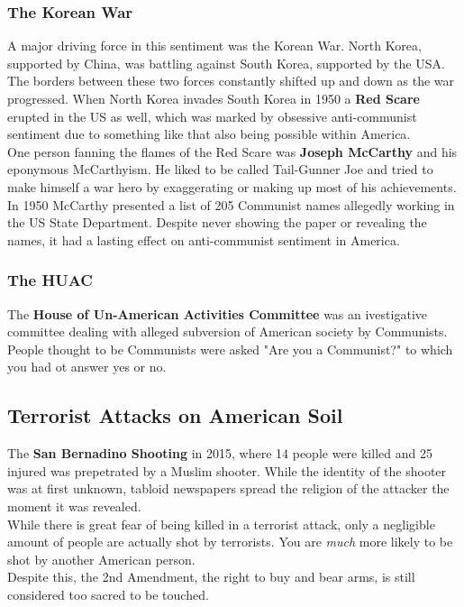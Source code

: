 \documentclass{article}
\begin{document}
	\subsubsection{The Korean War}
	A major driving force in this sentiment was the Korean War. North Korea, supported by China, was battling against South Korea, supported by the USA. The borders between these two forces constantly shifted up and down as the war progressed. When North Korea invades South Korea in 1950 a \textbf{Red Scare} erupted in the US as well, which was marked by obsessive anti-communist sentiment due to something like that also being possible within America. \\
	One person fanning the flames of the Red Scare was \textbf{Joseph McCarthy} and his eponymous McCarthyism. He liked to be called Tail-Gunner Joe and tried to make himself a war hero by exaggerating or making up most of his achievements. In 1950 McCarthy presented a list of 205 Communist names allegedly working in the US State Department. Despite never showing the paper or revealing the names, it had a lasting effect on anti-communist sentiment in America. \\
	\subsubsection{The HUAC}
	The \textbf{House of Un-American Activities Committee} was an ivestigative committee dealing with alleged subversion of American society by Communists. People thought to be Communists were asked "Are you a Communist?" to which you had ot answer yes or no. \\
	\subsection{Terrorist Attacks on American Soil}
	The \textbf{San Bernadino Shooting} in 2015, where 14 people were killed and 25 injured was prepetrated by a Muslim shooter. While the identity of the shooter was at first unknown, tabloid newspapers spread the religion of the attacker the moment it was revealed. \\
	While there is great fear of being killed in a terrorist attack, only a negligible amount of people are actually shot by terrorists. You are \textit{much} more likely to be shot by another American person. \\
	Despite this, the 2nd Amendment, the right to buy and bear arms, is still considered too sacred to be touched. \\
\end{document}
